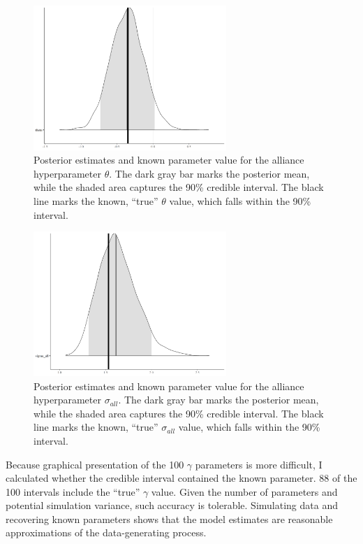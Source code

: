 \documentclass[12pt]{article}
\begin{document}
\begin{figure}[htbp]
	\centering
		\includegraphics[width=0.65\textwidth]{theta-sim-res.png}
	\caption{Posterior estimates and known parameter value for the alliance hyperparameter $\theta$. The dark gray bar marks the posterior mean, while the shaded area captures the 90\% credible interval. The black line marks the known, ``true'' $\theta$ value, which falls within the 90\% interval.}
	\label{fig:theta-sim-res}
\end{figure}


\begin{figure}[htbp]
	\centering
		\includegraphics[width=0.65\textwidth]{sall-sim-res.png}
	\caption{Posterior estimates and known parameter value for the alliance hyperparameter $\sigma_{all}$. The dark gray bar marks the posterior mean, while the shaded area captures the 90\% credible interval. The black line marks the known, ``true'' $\sigma_{all}$ value, which falls within the 90\% interval.}
	\label{fig:sall-sim-res}
\end{figure}


Because graphical presentation of the 100 $\gamma$ parameters is more difficult, I calculated whether the credible interval contained the known parameter. 
88 of the 100 intervals include the ``true'' $\gamma$ value. 
Given the number of parameters and potential simulation variance, such accuracy is tolerable. 
Simulating data and recovering known parameters shows that the model estimates are reasonable approximations of the data-generating process. 
\end{document}
